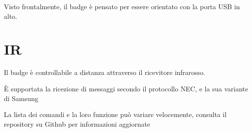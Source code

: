 \documentclass[10pt]{datasheet}
\newcommand*\circled[1]{\tikz[baseline=(char.base)]{
		\node[shape=circle,draw,inner sep=2pt, fill=white] (char) {#1};}}
\begin{document}
	\begin{center}

	\end{center}
		Visto frontalmente, il badge è pensato per essere orientato con la porta USB in alto. 
		
		\section{IR}
		Il badge è controllabile a distanza attraverso il ricevitore infrarosso.
		
		È supportata la ricezione di messaggi secondo il protocollo NEC, e la sua variante di Samsung
		
		La lista dei comandi e la loro funzione può variare velocemente, consulta il repository su Github per informazioni aggiornate
	
	\vfill\break
	
\end{document}
